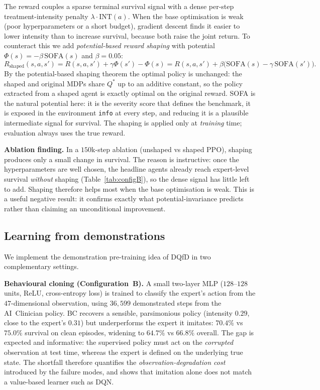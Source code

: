 \documentclass[11pt,a4paper]{article}
\begin{document}
The reward couples a sparse terminal survival signal with a dense per-step
treatment-intensity penalty $\lambda\cdot\mathrm{INT}(a)$. When the base
optimisation is weak (poor hyperparameters or a short budget), gradient descent
finds it easier to lower intensity than to increase survival, because both raise
the joint return. To counteract this we add \emph{potential-based reward shaping}
\cite{ng1999} with potential $\Phi(s)=-\beta\,\mathrm{SOFA}(s)$ and $\beta=0.05$:
\begin{equation}
  R_{\mathrm{shaped}}(s,a,s') =
  R(s,a,s') + \gamma\Phi(s') - \Phi(s)
  = R(s,a,s') + \beta\bigl(\mathrm{SOFA}(s) - \gamma\,\mathrm{SOFA}(s')\bigr).
  \label{eq:shaping}
\end{equation}
By the potential-based shaping theorem \cite{ng1999} the optimal policy is
unchanged: the shaped and original MDPs share $Q^*$ up to an additive constant, so
the policy extracted from a shaped agent is exactly optimal on the original reward.
SOFA is the natural potential here: it is the severity score that defines the
benchmark, it is exposed in the environment \texttt{info} at every step, and
reducing it is a plausible intermediate signal for survival. The shaping is applied
only at \emph{training} time; evaluation always uses the true reward.

\textbf{Ablation finding.} In a $150$k-step ablation (unshaped vs shaped PPO),
shaping produces only a small change in survival. The reason is instructive:
once the hyperparameters are well chosen, the headline agents already reach
expert-level survival \emph{without} shaping (Table~\ref{tab:configB}), so the
dense signal has little left to add. Shaping therefore helps most when the base
optimisation is weak. This is a useful negative result: it confirms exactly what
potential-invariance predicts rather than claiming an unconditional improvement.

\subsection{Learning from demonstrations}
\label{sec:lfd}

We implement the demonstration pre-training idea of DQfD \cite{hester2018} in two
complementary settings.

\textbf{Behavioural cloning (Configuration~B).} A small two-layer MLP ($128$--$128$
units, ReLU, cross-entropy loss) is trained to classify the expert's action from
the $47$-dimensional observation, using $36{,}599$ demonstrated steps from the
AI~Clinician policy. BC recovers a sensible, parsimonious policy (intensity $0.29$,
close to the expert's $0.31$) but underperforms the expert it imitates: $70.4\%$
vs $75.0\%$ survival on clean episodes, widening to $64.7\%$ vs $66.8\%$ overall.
The gap is expected and informative: the supervised policy must act on the
\emph{corrupted} observation at test time, whereas the expert is defined on the
underlying true state. The shortfall therefore quantifies the
\emph{observation-degradation cost} introduced by the failure modes, and shows
that imitation alone does not match a value-based learner such as DQN.
\end{document}
